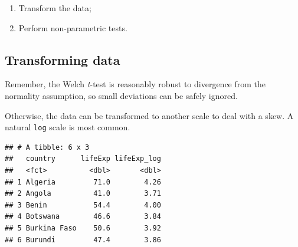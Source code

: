 \documentclass[12pt,]{krantz}
\makeatletter
\newenvironment{Shaded}{\begin{snugshade}}{\end{snugshade}}
\newcommand{\CommentTok}[1]{\textcolor[rgb]{0.56,0.35,0.01}{\textit{#1}}}
\newcommand{\DataTypeTok}[1]{\textcolor[rgb]{0.13,0.29,0.53}{#1}}
\newcommand{\DecValTok}[1]{\textcolor[rgb]{0.00,0.00,0.81}{#1}}
\newcommand{\KeywordTok}[1]{\textcolor[rgb]{0.13,0.29,0.53}{\textbf{#1}}}
\newcommand{\NormalTok}[1]{#1}
\newcommand{\OperatorTok}[1]{\textcolor[rgb]{0.81,0.36,0.00}{\textbf{#1}}}
\newcommand{\StringTok}[1]{\textcolor[rgb]{0.31,0.60,0.02}{#1}}
\providecommand{\tightlist}{%
  \setlength{\itemsep}{0pt}\setlength{\parskip}{0pt}}
\newenvironment{kframe}{%
\medskip{}
\setlength{\fboxsep}{.8em}
 \def\at@end@of@kframe{}%
 \ifinner\ifhmode%
  \def\at@end@of@kframe{\end{minipage}}%
  \begin{minipage}{\columnwidth}%
 \fi\fi%
 \def\FrameCommand##1{\hskip\@totalleftmargin \hskip-\fboxsep
 \colorbox{shadecolor}{##1}\hskip-\fboxsep
     \hskip-\linewidth \hskip-\@totalleftmargin \hskip\columnwidth}%
 \MakeFramed {\advance\hsize-\width
   \@totalleftmargin\z@ \linewidth\hsize
   \@setminipage}}%
 {\par\unskip\endMakeFramed%
 \at@end@of@kframe}
\renewenvironment{Shaded}{\begin{kframe}}{\end{kframe}}
\theoremstyle{definition}
\theoremstyle{definition}
\theoremstyle{definition}
\theoremstyle{remark}
\makeatother
\begin{document}
\begin{enumerate}
\def\labelenumi{\arabic{enumi}.}
\tightlist
\item
  Transform the data;
\item
  Perform non-parametric tests.
\end{enumerate}

\hypertarget{transforming-data}{%
\subsection{Transforming data}\label{transforming-data}}


Remember, the Welch \emph{t}-test is reasonably robust to divergence
from the normality assumption, so small deviations can be safely
ignored.

Otherwise, the data can be transformed to another scale to deal with a
skew. A natural \texttt{log} scale is most common.

\begin{Shaded}
\end{Shaded}

\begin{verbatim}
## # A tibble: 6 x 3
##   country      lifeExp lifeExp_log
##   <fct>          <dbl>       <dbl>
## 1 Algeria         71.0        4.26
## 2 Angola          41.0        3.71
## 3 Benin           54.4        4.00
## 4 Botswana        46.6        3.84
## 5 Burkina Faso    50.6        3.92
## 6 Burundi         47.4        3.86
\end{verbatim}
\end{document}
